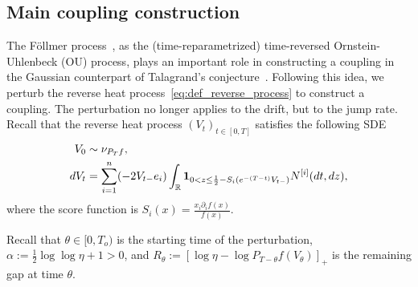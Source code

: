 \documentclass[11pt]{article}
\newcommand{\excess}{\alpha}
\newcommand{\uV}{V}
\newcommand{\To}{{T_o}}
\newcommand{\tagi}{{[i]}}
\theoremstyle{named}
\theoremstyle{plain}
\newcommand{\defn}{:=}
\newcommand{\real}{\ensuremath{\mathbb{R}}}
\begin{document}
\subsection{Main coupling construction}
\label{sub:main_stochastic_construction}
The F\"ollmer process~\cite{follmer2005entropy}, as the (time-reparametrized) time-reversed Ornstein-Uhlenbeck (OU) process, plays an important role 
in constructing a coupling in the Gaussian counterpart of Talagrand's conjecture~\cite{eldan2018regularization}. Following this idea, we perturb the reverse heat process~\eqref{eq:def_reverse_process} to construct a coupling. The perturbation no longer applies to the drift, but to the jump rate. Recall that the reverse heat process $(\uV_t)_{t\in [0, T]}$ satisfies the following SDE
\begin{align*}
  \uV_0 &\sim \nu_{P_T f}, \notag\\
  d \uV_t &=  \sum_{i=1}^n (-2 \uV_{t-} e_i) \int_\real \mathbf{1}_{0 < z \leq \frac12 - S_i(e^{-{(T-t)}} \uV_{t-})} N^\tagi(dt, dz),
\end{align*}
where the score function is $S_i(x) = \frac{x_i \partial_i f (x)}{ f(x)}$. 

Recall that $\theta \in [0, \To)$ is the starting time of the perturbation,  $\excess \defn \frac{1}{2} \log \log \eta + 1 > 0$, and $R_\theta \defn [\log \eta - \log P_{T-\theta} f(\uV_\theta)]_+$ is the remaining gap at time $\theta$.
\end{document}
